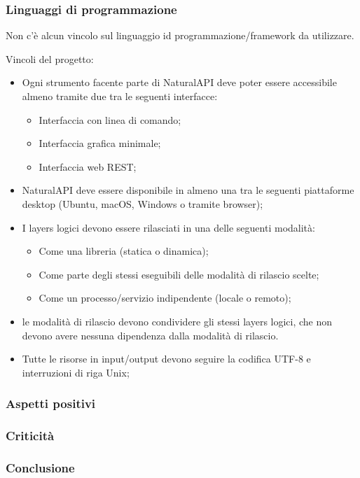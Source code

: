         \subsubsection{Linguaggi di programmazione}
        Non c'è alcun vincolo sul linguaggio id programmazione/framework da utilizzare.
        
Vincoli del progetto:
   	\begin{itemize}
   		\item Ogni strumento facente parte di NaturalAPI deve poter essere accessibile almeno tramite due tra le seguenti interfacce:
   			\begin{itemize}
   				\item Interfaccia con linea di comando;
   				\item Interfaccia grafica minimale;
   				\item Interfaccia web REST;
   			\end{itemize}
   			\item NaturalAPI deve essere disponibile in almeno una tra le seguenti piattaforme desktop (Ubuntu, macOS, Windows o tramite browser);
   			\item I layers logici devono essere rilasciati in una delle seguenti modalità:
   				\begin{itemize}
   					\item Come una libreria (statica o dinamica);
   					\item Come parte degli stessi eseguibili delle modalità di rilascio scelte;
   					\item Come un processo/servizio indipendente (locale o remoto);
   				\end{itemize}
   			\item le modalità di rilascio devono condividere gli stessi layers logici, che non devono avere nessuna dipendenza dalla modalità di rilascio.
   			\item Tutte le risorse in input/output devono seguire la codifica UTF-8 e interruzioni di riga Unix;
   	\end{itemize} 
    
    \subsubsection{Aspetti positivi}
    
    \subsubsection{Criticità}
    
    \subsubsection{Conclusione}